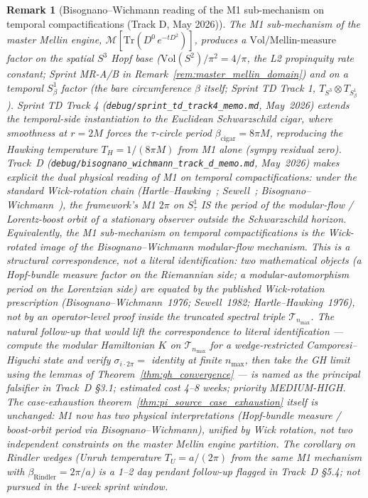 \documentclass[11pt]{article}
\newtheorem{remark}{Remark}
\begin{document}
\begin{remark}[Bisognano--Wichmann reading of the M1 sub-mechanism on
temporal compactifications (Track D, May 2026)]
\label{rem:bisognano_wichmann_reading}
The M1 sub-mechanism of the master Mellin engine,
$\mathcal{M}[\mathrm{Tr}(D^0\, e^{-tD^2})]$, produces a
$\mathrm{Vol}/\mathrm{Mellin\text{-}measure}$ factor on the spatial
$S^3$ Hopf base ($\mathrm{Vol}(S^2)/\pi^2 = 4/\pi$, the L2 propinquity
rate constant; Sprint MR-A/B in Remark~\ref{rem:master_mellin_domain})
and on a temporal $S^1_\beta$ factor (the bare circumference $\beta$
itself; Sprint TD Track 1, $T_{S^3}\otimes T_{S^1_\beta}$).  Sprint TD
Track 4 (\texttt{debug/sprint\_td\_track4\_memo.md}, May~2026) extends
the temporal-side instantiation to the Euclidean Schwarzschild cigar,
where smoothness at $r=2M$ forces the $\tau$-circle period
$\beta_{\mathrm{cigar}} = 8\pi M$, reproducing the Hawking temperature
$T_H = 1/(8\pi M)$ from M1 alone (sympy residual zero).  Track~D
(\texttt{debug/bisognano\_wichmann\_track\_d\_memo.md}, May~2026) makes
explicit the dual physical reading of M1 on temporal compactifications:
under the standard Wick-rotation chain
(Hartle--Hawking~\cite{hartle_hawking1976};
 Sewell~\cite{sewell1982};
 Bisognano--Wichmann~\cite{bisognano_wichmann1976}),
the framework's M1 $2\pi$ on $S^1_\tau$ IS the period of the
modular-flow / Lorentz-boost orbit of a stationary observer outside
the Schwarzschild horizon.  Equivalently, the M1 sub-mechanism on
temporal compactifications is the Wick-rotated image of the
Bisognano--Wichmann modular-flow mechanism.  This is a
\emph{structural correspondence}, not a literal identification: two
mathematical objects (a Hopf-bundle measure factor on the Riemannian
side; a modular-automorphism period on the Lorentzian side) are
equated by the published Wick-rotation prescription
(Bisognano--Wichmann~1976; Sewell~1982; Hartle--Hawking~1976), not by
an operator-level proof inside the truncated spectral triple
$\mathcal{T}_{n_{\max}}$.  The natural follow-up that would lift the
correspondence to literal identification --- compute the modular
Hamiltonian $K$ on $\mathcal{T}_{n_{\max}}$ for a wedge-restricted
Camporesi--Higuchi state and verify $\sigma_{i\cdot 2\pi} = $ identity
at finite $n_{\max}$, then take the GH limit using the lemmas of
Theorem~\ref{thm:gh_convergence} --- is named as the principal falsifier
in Track~D \S 3.1; estimated cost 4--8 weeks; priority MEDIUM-HIGH.
The case-exhaustion theorem~\ref{thm:pi_source_case_exhaustion} itself
is unchanged: M1 now has \emph{two physical interpretations}
(Hopf-bundle measure / boost-orbit period via Bisognano--Wichmann),
unified by Wick rotation, not two independent constraints on the
master Mellin engine partition.
The corollary on Rindler wedges (Unruh temperature
$T_U = a/(2\pi)$ from the same M1 mechanism with
$\beta_{\mathrm{Rindler}} = 2\pi/a$) is a 1--2 day pendant follow-up
flagged in Track~D \S 5.4; not pursued in the 1-week sprint window.


\end{remark}
\end{document}

